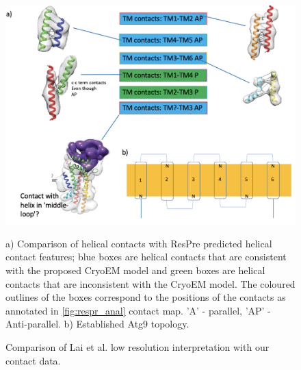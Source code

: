 \begin{figure}[th!]
    \centering
    \includegraphics[width=\textwidth]{Modelling of Atg9/cmap_comparison_w_lai_etal.png}
    \caption{Comparison of Lai et al. low resolution interpretation with our contact data. }
    \label{fig:respre_anal2}
    \small
    a) Comparison of helical contacts with ResPre predicted helical contact features; blue boxes are helical contacts that are consistent with the proposed CryoEM model and green boxes are helical contacts that are inconsistent with the CryoEM model.  The coloured outlines of the boxes correspond to the positions of the contacts as annotated in \ref{fig:respr_anal} contact map. 'A' - parallel, 'AP' -  Anti-parallel.
    b) Established Atg9 topology.
\end{figure}

\newpage



